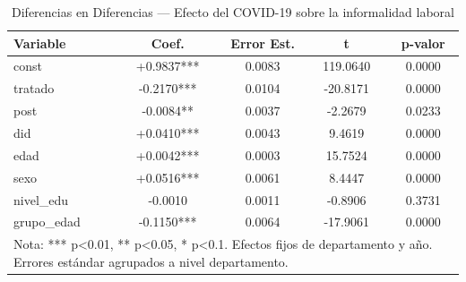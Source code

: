 \begin{table}[htbp]
\centering
\caption{Diferencias en Diferencias — Efecto del COVID-19 sobre la informalidad laboral}
\label{tab:did}
\begin{tabular}{lcccc}
\hline\hline
Variable & Coef. & Error Est. & t & p-valor \\
\hline
const & +0.9837*** & 0.0083 & 119.0640 & 0.0000 \\
tratado & -0.2170*** & 0.0104 & -20.8171 & 0.0000 \\
post & -0.0084** & 0.0037 & -2.2679 & 0.0233 \\
did & +0.0410*** & 0.0043 & 9.4619 & 0.0000 \\
edad & +0.0042*** & 0.0003 & 15.7524 & 0.0000 \\
sexo & +0.0516*** & 0.0061 & 8.4447 & 0.0000 \\
nivel_edu & -0.0010 & 0.0011 & -0.8906 & 0.3731 \\
grupo_edad & -0.1150*** & 0.0064 & -17.9061 & 0.0000 \\
\hline
\multicolumn{5}{l}{\footnotesize Nota: *** p<0.01, ** p<0.05, * p<0.1. Efectos fijos de departamento y año. Errores estándar agrupados a nivel departamento.}\\
\hline\hline
\end{tabular}
\end{table}